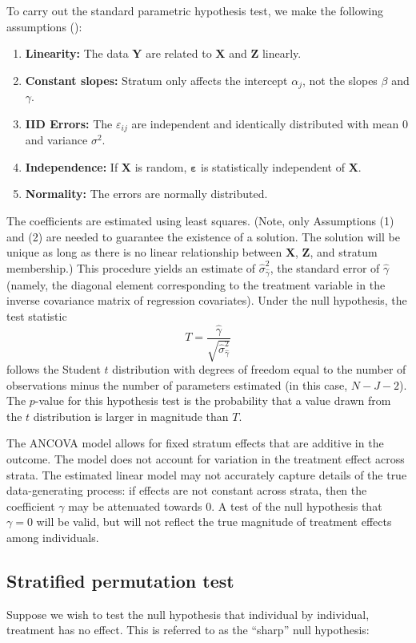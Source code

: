 \documentclass[12pt]{article}
\begin{document}
To carry out the standard parametric hypothesis test, we make the following assumptions (\cite{freedman_statistical_2005}):

\begin{enumerate}
\item \textbf{Linearity:} The data $\mathbf{Y}$ are related to $\mathbf{X}$ and $\mathbf{Z}$ linearly.
\item \textbf{Constant slopes:} Stratum only affects the intercept $\alpha_j$, not the slopes $\beta$ and $\gamma$.
\item \textbf{IID Errors:} The $\varepsilon_{ij}$ are independent and identically distributed with mean $0$ and variance $\sigma^2$.
\item \textbf{Independence:} If $\mathbf{X}$ is random, $\mathbf{\varepsilon}$ is statistically independent of $\mathbf{X}$.
\item \textbf{Normality:} The errors are normally distributed.
\end{enumerate}

The coefficients are estimated using least squares.
(Note, only Assumptions (1) and (2) are needed to guarantee the existence of a solution.
The solution will be unique as long as there is no linear relationship between $\mathbf{X}$, $\mathbf{Z}$, and stratum membership.)
This procedure yields an estimate of $\hat{\sigma}_{\hat{\gamma}}^2$, the  standard error of $\hat{\gamma}$
(namely, the diagonal element corresponding to the treatment variable in the inverse covariance matrix of regression covariates).
Under the null hypothesis, the test statistic 
$$ T = \frac{\hat{\gamma}}{\sqrt{ \hat{\sigma}_{\hat{\gamma}}^2}}$$
follows the Student $t$ distribution with degrees of freedom equal to the number of observations minus the number of parameters estimated (in this case, $N - J - 2$).
The $p$-value for this hypothesis test is the probability that a value drawn from the $t$ distribution is larger in magnitude than $T$.


The ANCOVA model allows for fixed stratum effects that are additive in the outcome.  
The model does not account for variation in the treatment effect across strata.  
The estimated linear model may not accurately capture details of the true data-generating process:
if effects are not constant across strata, then the coefficient $\gamma$ may be attenuated towards 0.  
A test of the null hypothesis that $\gamma = 0$ will be valid, but will not reflect the true magnitude of treatment effects among individuals.

\subsection{Stratified permutation test}
Suppose we wish to test the null hypothesis that individual by individual, treatment has no effect.
This is referred to as the ``sharp'' null hypothesis:
\end{document}
